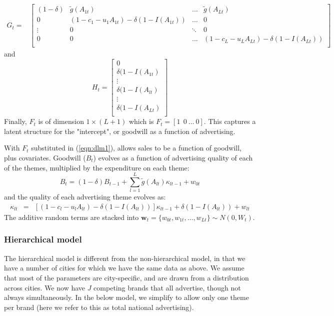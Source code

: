 \documentclass[11pt]{article} %
\begin{document}
\begin{equation}
\label{eqn:Gt1}
\begin{array}{ll}
      G_t = & \left[\begin{array}{cccc}
		 (1-\delta) & \tilde{g}(A_{1t})& \ldots & \tilde{g}(A_{Lt}) \\
		0 & (1-c_1-u_1 A_{1t}) - \delta(1-I(A_{1t})) & \ldots & 0 \\
\vdots & 0 & \ddots & 0\\

		0 & 0 & \ldots & (1-c_L-u_L A_{Lt}) - \delta(1-I(A_{Lt})) \\
		\end{array}\right]
\end{array}
\end{equation}
and 
\begin{equation}
H_t =  \left[ \begin{array}{c}
	0 \\
	\delta(1-I(A_{1t})\\
\vdots\\
	\delta(1-I(A_{lt})\\
\vdots\\
	\delta(1-I(A_{Lt})\\
	\end{array}
\right]
\end{equation}
Finally, $F_t$ is of dimension $1\times (L+1)$ which is $F_t=\left[ 1~~0~\ldots~0 \right]$.  This captures
a latent structure for the "intercept", or goodwill as a function of advertising.   

With $F_t$ substituted in (\ref{eqn:dlm1}), allows sales to be a function of goodwill, plus covariates.  Goodwill ($B_t$) evolves as a 
function of advertising quality of each of the themes, multiplied by the expenditure on each theme:
\[
B_t = (1-\delta) B_{t-1} + \sum_{l=1}^L \tilde{g} (A_{lt}) \kappa_{lt-1} + w_{0t}
\]
and the quality of each advertising theme evolves as:
\begin{eqnarray}
\kappa_{lt} & = & \left[(1-c_l-u_l A_{lt}) - \delta(1-I(A_{lt})) \right] \kappa_{lt-1} + \delta(1-I(A_{lt})) + w_{lt}
\end{eqnarray}
The additive random terms are stacked into $\mathbf{w}_t = \{ w_{0t}, w_{1t}, \ldots, w_{Lt} \}\sim N(0,W_t)$.
\subsubsection{Hierarchical model}
The hierarchical model is different from the non-hierarchical model, in that we have a number of cities
for which we have the same data as above.  We assume that most of the parameters are city-specific,
and are drawn from a distribution across cities.  We now have $J$ competing brands that all advertise, 
though not always simultaneously.  In the below model, we simplify to allow only one theme per brand (here we 
refer to this as total national advertising).  
\end{document}
